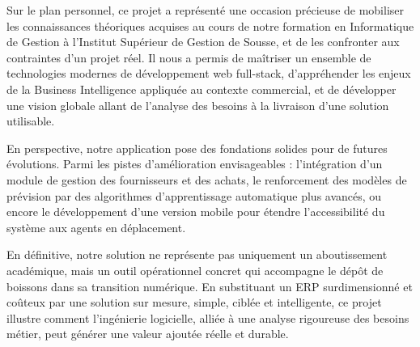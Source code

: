 Sur le plan personnel, ce projet a représenté une occasion précieuse de mobiliser
les connaissances théoriques acquises au cours de notre formation en Informatique
de Gestion à l'Institut Supérieur de Gestion de Sousse, et de les confronter aux
contraintes d'un projet réel. Il nous a permis de maîtriser un ensemble de
technologies modernes de développement web full-stack, d'appréhender les enjeux
de la Business Intelligence appliquée au contexte commercial, et de développer
une vision globale allant de l'analyse des besoins à la livraison d'une solution
utilisable.

En perspective, notre application pose des fondations solides pour de futures
évolutions. Parmi les pistes d'amélioration envisageables : l'intégration d'un
module de gestion des fournisseurs et des achats, le renforcement des modèles
de prévision par des algorithmes d'apprentissage automatique plus avancés, ou
encore le développement d'une version mobile pour étendre l'accessibilité du
système aux agents en déplacement.

En définitive, notre solution ne représente pas uniquement un aboutissement
académique, mais un outil opérationnel concret qui accompagne le dépôt de boissons
dans sa transition numérique. En substituant un ERP surdimensionné et coûteux
par une solution sur mesure, simple, ciblée et intelligente, ce projet illustre
comment l'ingénierie logicielle, alliée à une analyse rigoureuse des besoins
métier, peut générer une valeur ajoutée réelle et durable.
